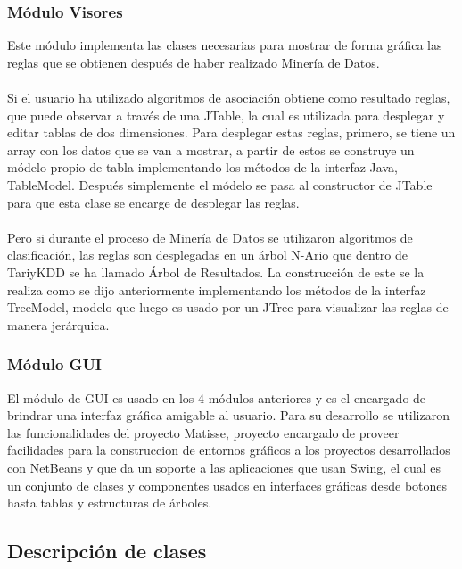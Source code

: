 \subsubsection{M\'odulo Visores}
Este m\'odulo implementa las clases necesarias para mostrar de forma gr\'afica las reglas que se obtienen 
despu\'es de haber realizado Miner\'ia de Datos.\\
\\
Si el usuario ha utilizado algoritmos de asociaci\'on obtiene como resultado reglas, que puede observar a
trav\'es de una JTable, la cual es utilizada para desplegar y editar tablas de dos dimensiones. Para desplegar
estas reglas, primero, se tiene un array con los datos que se van a mostrar, a partir de estos se construye un
m\'odelo propio de tabla implementando los m\'etodos de la interfaz Java, TableModel. Des\-pu\'es simplemente el 
m\'odelo se pasa al constructor de JTable para que esta clase se encarge de desplegar las reglas.\\
\\
Pero si durante el proceso de Miner\'ia de Datos se utilizaron algoritmos de clasificaci\'on, las reglas son 
desplegadas en un \'arbol N-Ario que dentro de TariyKDD se ha llamado \'Arbol de Resultados. La construcci\'on de
este se la realiza como se dijo anteriormente implementando los m\'etodos de la interfaz TreeModel, modelo que 
luego es usado por un JTree para visualizar las reglas de manera jer\'arquica.

\subsubsection{M\'odulo GUI}

El m\'odulo de GUI es usado en los 4 m\'odulos anteriores y es el encargado de brindrar una interfaz gr\'afica amigable al usuario.  Para su desarrollo se utilizaron las funcionalidades del proyecto Matisse, proyecto encargado de proveer facilidades para la construccion de entornos gr\'aficos a los proyectos desarrollados con NetBeans y que da un soporte a las aplicaciones que usan Swing, el cual es un conjunto de clases y componentes usados en interfaces gr\'aficas desde botones hasta tablas y estructuras de \'arboles.
\subsection{Descripci\'on de clases}

